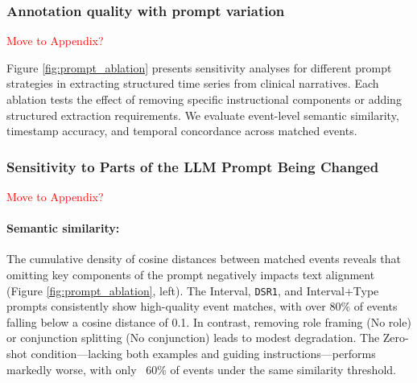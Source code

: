 

\subsubsection{Annotation quality with prompt variation} \textcolor{red}{Move to Appendix?}

Figure \ref{fig:prompt_ablation} presents sensitivity analyses for different prompt strategies in extracting structured time series from clinical narratives. Each ablation tests the effect of removing specific instructional components or adding structured extraction requirements. We evaluate event-level semantic similarity, timestamp accuracy, and temporal concordance across matched events. 


\subsubsection{Sensitivity to Parts of the LLM Prompt Being Changed} \textcolor{red}{Move to Appendix?}



\paragraph{Semantic similarity:}
The cumulative density of cosine distances between matched events reveals that omitting key components of the prompt negatively impacts text alignment (Figure \ref{fig:prompt_ablation}, left). The Interval, \texttt{DSR1}, and Interval+Type prompts consistently show high-quality event matches, with over 80\% of events falling below a cosine distance of 0.1. In contrast, removing role framing (No role) or conjunction splitting (No conjunction) leads to modest degradation. The Zero-shot condition—lacking both examples and guiding instructions—performs markedly worse, with only ~60\% of events under the same similarity threshold.

